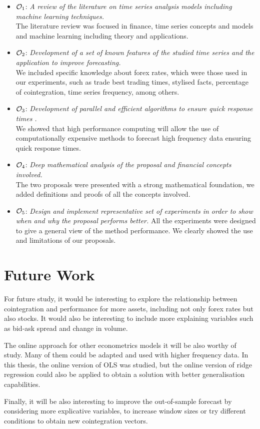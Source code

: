 \begin{itemize}
\item $\Large \mathcal{O}_1$: \emph{A review of the literature on time series
analysis models including machine learning techniques.}\\
The literature review was focused in finance, time series concepts and models and machine learning including theory and applications.
\item $\Large \mathcal{O}_2$: \emph{Development of a set of known features of the
studied time series and the application to improve forecasting.} \\
We included specific knowledge about forex rates, which were those used in our experiments, such as trade best trading times, stylised facts, percentage of cointegration, time series frequency, among others.
\item $\Large \mathcal{O}_3$: \emph{Development of parallel and efficient
algorithms to ensure quick response times .} \\
We showed that high performance computing will allow the use of computationally expensive methods to forecast high frequency data ensuring quick response times.
\item $\Large \mathcal{O}_4$: \emph{Deep mathematical analysis of the proposal
and financial concepts involved.} \\
The two proposals were presented with a strong mathematical foundation, we added definitions and proofs of all the concepts involved.
\item $\Large \mathcal{O}_5$: \emph{Design and implement representative set of
experiments in order to show when and why the proposal performs better.}
All the experiments were designed to give a general view of the method performance. We clearly showed the use and limitations of our proposals.
\end{itemize}


\section{Future Work}

For future study, it would be interesting to explore the relationship between
cointegration and performance for more assets, including not only forex rates
but also stocks. It would also be interesting to include more explaining
variables such as bid-ask spread and change in volume.

The online approach for other econometrics models it will be also worthy of 
study. Many of them could be adapted and used with higher frequency data. In
this thesis, the online version of OLS was studied, but the online version of
ridge regression could also be applied to obtain a solution with better
generalisation capabilities.

Finally, it will be also interesting to improve the out-of-sample forecast
by considering more explicative variables, to increase window sizes or try different
conditions to obtain new cointegration vectors.

